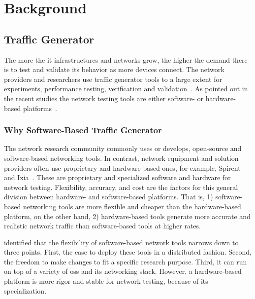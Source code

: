 \chapter{Background}\label{background}
%
%
\section{Traffic Generator}\label{sec:tg}
The more the \gls{it} infrastructures and networks grow, the higher the demand there is to test and validate its behavior as more devices connect.
The network providers and researchers use traffic generator tools to a large extent for experiments, performance testing, verification and validation~\cite{botta2010you, molnar2013validate}.
As pointed out in the recent studies the network testing tools are either software- or hardware-based platforms~\cite{turull2016pktgen, emmerich2015moongen, antichi2014osnt, ghobadi2012caliper}.

\subsection{Why Software-Based Traffic Generator}
The network research community commonly uses or develops, open-source and software-based networking tools.
In contrast, network equipment and solution providers often use proprietary and hardware-based ones, for example, Spirent~\cite{Networkd93:online} and Ixia~\cite{IxiaMake81:online}.
These are proprietary and specialized software and hardware for network testing.
Flexibility, accuracy, and cost are the factors for this general division between hardware- and software-based platforms.
That is, 1) software-based networking tools are more flexible and cheaper than the hardware-based platform, on the other hand, 2) hardware-based tools generate more accurate and realistic network traffic than software-based tools at higher rates.

\skippara \citet*{botta2010you} identified that the flexibility of software-based network tools narrows down to three points.
First, the ease to deploy these tools in a distributed fashion.
Second, the freedom to make changes to fit a specific research purpose.
Third, it can run on top of a variety of \glspl{os} and its networking stack.
However, a hardware-based platform is more rigor and stable for network testing, because of its specialization.

